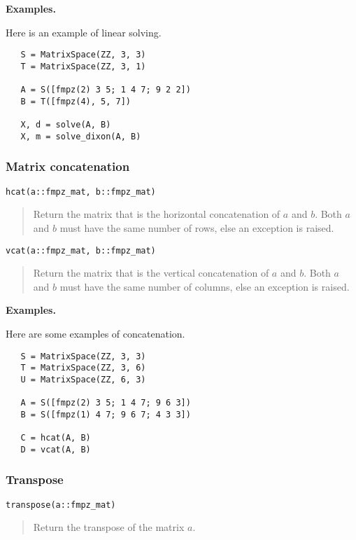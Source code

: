\documentclass[a4paper,10pt]{article}
\newcommand{\desc}[1]{\vspace{-3mm}\begin{quote}#1\end{quote}}
\begin{document}
{{\textbf{Examples.}

Here is an example of linear solving.

\begin{lstlisting}
   S = MatrixSpace(ZZ, 3, 3)
   T = MatrixSpace(ZZ, 3, 1)

   A = S([fmpz(2) 3 5; 1 4 7; 9 2 2])   
   B = T([fmpz(4), 5, 7])

   X, d = solve(A, B)
   X, m = solve_dixon(A, B)
\end{lstlisting}

\subsubsection{Matrix concatenation}

\begin{lstlisting}
hcat(a::fmpz_mat, b::fmpz_mat)
\end{lstlisting}

\desc{Return the matrix that is the horizontal concatenation of $a$ and $b$.
Both $a$ and $b$ must have the same number of rows, else an exception is raised.}

\begin{lstlisting}
vcat(a::fmpz_mat, b::fmpz_mat)
\end{lstlisting}

\desc{Return the matrix that is the vertical concatenation of $a$ and $b$.
Both $a$ and $b$ must have the same number of columns, else an exception is raised.}

\textbf{Examples.}

Here are some examples of concatenation.

\begin{lstlisting}
   S = MatrixSpace(ZZ, 3, 3)
   T = MatrixSpace(ZZ, 3, 6)
   U = MatrixSpace(ZZ, 6, 3)

   A = S([fmpz(2) 3 5; 1 4 7; 9 6 3])
   B = S([fmpz(1) 4 7; 9 6 7; 4 3 3])

   C = hcat(A, B)
   D = vcat(A, B)
\end{lstlisting}

\subsubsection{Transpose}

\begin{lstlisting}
transpose(a::fmpz_mat)
\end{lstlisting}

\desc{Return the transpose of the matrix $a$.}

}}
\end{document}
